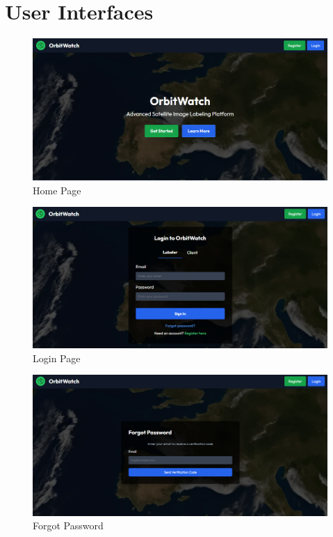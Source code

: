 \documentclass[12pt, titlepage]{article}
\begin{document}

\section{User Interfaces}
\begin{figure}[H]
    \centering
    \includegraphics[width=\linewidth]{home.png}
    \caption{Home Page}
\end{figure}
\begin{figure}[H]
    \centering
    \includegraphics[width=\linewidth]{login.png}
    \caption{Login Page}
\end{figure}
\begin{figure}[H]
    \centering
    \includegraphics[width=\linewidth]{forgot_password.png}
    \caption{Forgot Password}
\end{figure}
\end{document}
